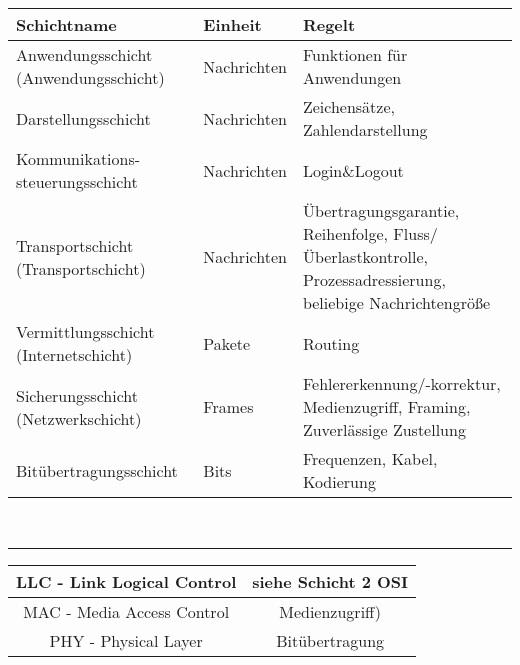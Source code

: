\begin{minipage}{0.45\textwidth}
\begin{tabular}{| p{} | p{} | p{} |}
\hline 
\textbf{ Schichtname}	& \textbf{Einheit} & \textbf{Regelt} \\
\hline 
Anwendungsschicht (Anwendungsschicht) & Nachrichten	& Funktionen für Anwendungen \\
\hline 
Darstellungsschicht  	& 		Nachrichten 	&Zeichensätze, Zahlendarstellung         \\
\hline 
Kommunikations- steuerungsschicht & Nachrichten	& Login\&Logout 			        \\
\hline 
Transportschicht	(Transportschicht)	&  Nachrichten	 & Übertragungsgarantie,
Reihenfolge, Fluss/Überlastkontrolle, Prozessadressierung, beliebige Nachrichtengröße  \\
\hline 
Vermittlungsschicht \mbox{(Internetschicht)}	&  Pakete 	& Routing						\\
\hline 
Sicherungsschicht   (Netzwerkschicht)	&  Frames	& Fehlererkennung/-korrektur, Medienzugriff, Framing, Zuverlässige Zustellung	\\
\hline 
Bitübertragungsschicht 	&  Bits 	& Frequenzen, Kabel, Kodierung  \\
\hline 
\end{tabular}
\end{minipage}\\
\rule{4cm}{0pt}
\begin{tabular}{|c|c|}
\hline
LLC - Link Logical Control 	& siehe Schicht 2 OSI		\\
\hline
MAC - Media Access Control 	& Medienzugriff)	\\
\hline
PHY - Physical Layer  		& Bitübertragung \\
\hline
\end{tabular}\\

